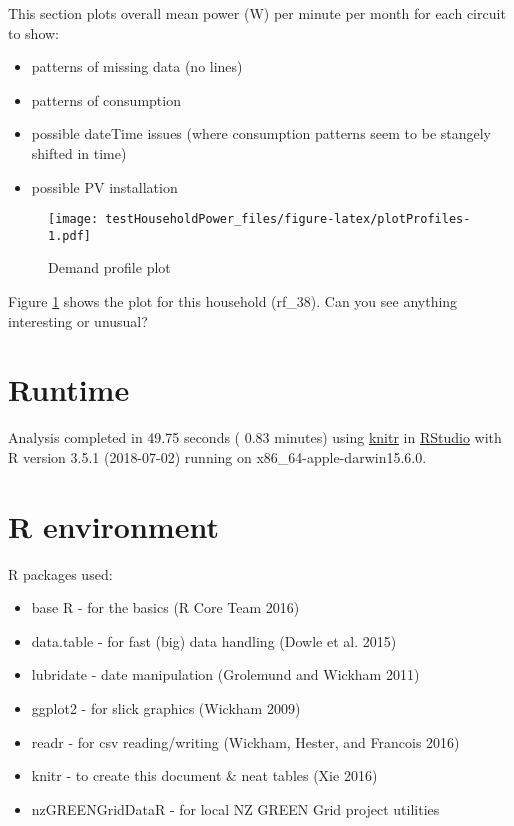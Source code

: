 \documentclass[]{article}
\providecommand{\tightlist}{%
  \setlength{\itemsep}{0pt}\setlength{\parskip}{0pt}}
\theoremstyle{definition}
\theoremstyle{definition}
\theoremstyle{definition}
\theoremstyle{remark}
\begin{document}
This section plots overall mean power (W) per minute per month for each
circuit to show:

\begin{itemize}
\tightlist
\item
  patterns of missing data (no lines)
\item
  patterns of consumption
\item
  possible dateTime issues (where consumption patterns seem to be
  stangely shifted in time)
\item
  possible PV installation
\end{itemize}

\begin{figure}
\centering
\texttt{[image: testHouseholdPower\_files/figure-latex/plotProfiles-1.pdf]}
\caption{\label{fig:plotProfiles}Demand profile plot}
\end{figure}

Figure \ref{fig:plotProfiles} shows the plot for this household
(rf\_38). Can you see anything interesting or unusual?

\section{Runtime}\label{runtime}

Analysis completed in 49.75 seconds ( 0.83 minutes) using
\href{https://cran.r-project.org/package=knitr}{knitr} in
\href{http://www.rstudio.com}{RStudio} with R version 3.5.1 (2018-07-02)
running on x86\_64-apple-darwin15.6.0.

\section{R environment}\label{r-environment}

R packages used:

\begin{itemize}
\tightlist
\item
  base R - for the basics (R Core Team 2016)
\item
  data.table - for fast (big) data handling (Dowle et al. 2015)
\item
  lubridate - date manipulation (Grolemund and Wickham 2011)
\item
  ggplot2 - for slick graphics (Wickham 2009)
\item
  readr - for csv reading/writing (Wickham, Hester, and Francois 2016)
\item
  knitr - to create this document \& neat tables (Xie 2016)
\item
  nzGREENGridDataR - for local NZ GREEN Grid project utilities
\end{itemize}
\end{document}
